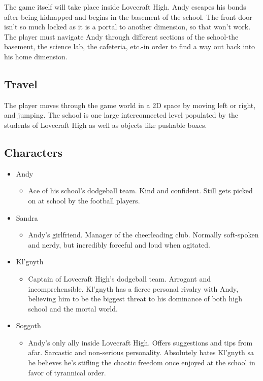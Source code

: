 \documentclass [12pt]{article}
\begin{document}
The game itself will take place inside Lovecraft High. Andy escapes his bonds after being kidnapped and begins in the basement of the school. The front door isn't so much locked as it is a portal to another dimension, so that won't work. The player must navigate Andy through different sections of the school-the basement, the science lab, the cafeteria, etc.-in order to find a way out back into his home dimension.

\subsection*{Travel}

The player moves through the game world in a 2D space by moving left or right, and jumping. The school is one large interconnected level populated by the students of Lovecraft High as well as objects like pushable boxes.
\newpage

\subsection*{Characters}

\begin{itemize}
\item Andy
	\begin{itemize}
	\item Ace of his school's dodgeball team. Kind and confident. Still gets picked on at school by the football players.
	\end{itemize}

\item Sandra
	\begin{itemize}
	\item Andy's girlfriend. Manager of the cheerleading club. Normally soft-spoken and nerdy, but incredibly forceful and loud when agitated.
	\end{itemize}

\item Kl'gnyth
	\begin{itemize}
	\item Captain of Lovecraft High's dodgeball team. Arrogant and incomprehensible. Kl'gnyth has a fierce personal rivalry with Andy, believing him to be the biggest threat to his dominance of both high school and the mortal world.
	\end{itemize}

\item Soggoth
	\begin{itemize}
	\item Andy's only ally inside Lovecraft High. Offers suggestions and tips from afar. Sarcastic and non-serious personality. Absolutely hates Kl'gnyth sa he believes he's stifling the chaotic freedom once enjoyed at the school in favor of tyrannical order.
	\end{itemize}
\end{itemize}
\end{document}
